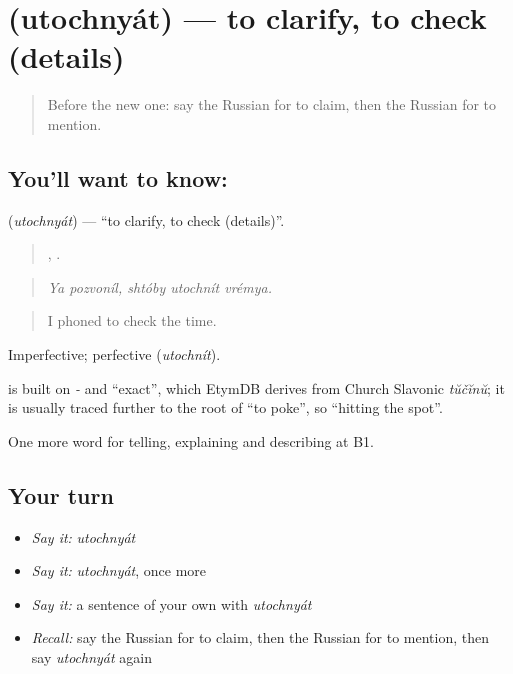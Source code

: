 \section[\texorpdfstring{\ru{уточнять} (utochnyát)}{уточнять (utochnyát)}]{ (utochnyát) — to clarify, to check (details)}

\label{lesson:RU-C283-utochnyat}



\begin{quote}
Before the new one: say the Russian for to claim, then the Russian for to mention.
\end{quote}

\subsection*{You'll want to know: }
\textbf{} (\emph{utochnyát}) — \textquotedblleft{}to clarify, to check (details)\textquotedblright{}.

\begin{quote}
 ,   .
\end{quote}

\begin{quote}
\emph{Ya pozvoníl, shtóby utochnít vrémya.}
\end{quote}

\begin{quote}
I phoned to check the time.
\end{quote}

Imperfective; perfective \emph{} (\emph{utochnít}).

\begin{cousinweb}
\emph{} is built on \emph{-} and \emph{} \textquotedblleft{}exact\textquotedblright{}, which EtymDB derives from Church Slavonic \emph{tŭčĭnŭ}; it is usually traced further to the root of \emph{} \textquotedblleft{}to poke\textquotedblright{}, so \textquotedblleft{}hitting the spot\textquotedblright{}.
\end{cousinweb}

\begin{grammarlens}[title={What you've built}]
One more word for telling, explaining and describing at B1.
\end{grammarlens}

\subsection*{Your turn}
\begin{itemize}
\raggedright
  \item \emph{Say it:} \emph{utochnyát}
  \item \emph{Say it:} \emph{utochnyát}, once more
  \item \emph{Say it:} a sentence of your own with \emph{utochnyát}
  \item \emph{Recall:} say the Russian for to claim, then the Russian for to mention, then say \emph{utochnyát} again
\end{itemize}

